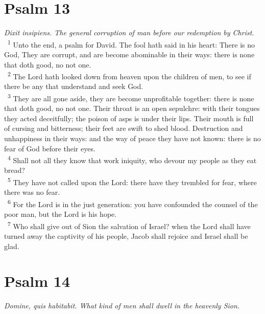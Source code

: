 \documentclass[a5paper,12pt]{article}
\begin{document}
\begin{multicols*}{2}
\section{Psalm 13}
\label{sec:org288996b}
\emph{Dixit insipiens. The general corruption of man before our redemption by Christ.}\\

~\textsuperscript{1} Unto the end, a psalm for David. The fool hath said in his heart: There is no God, They are corrupt, and are become abominable in their ways: there is none that doth good, no not one.\\
~\textsuperscript{2} The Lord hath looked down from heaven upon the children of men, to see if there be any that understand and seek God.\\
~\textsuperscript{3} They are all gone aside, they are become unprofitable together: there is none that doth good, no not one. Their throat is an open sepulchre: with their tongues they acted deceitfully; the poison of asps is under their lips. Their mouth is full of cursing and bitterness; their feet are swift to shed blood. Destruction and unhappiness in their ways: and the way of peace they have not known: there is no fear of God before their eyes.\\
~\textsuperscript{4} Shall not all they know that work iniquity, who devour my people as they eat bread?\\
~\textsuperscript{5} They have not called upon the Lord: there have they trembled for fear, where there was no fear.\\
~\textsuperscript{6} For the Lord is in the just generation: you have confounded the counsel of the poor man, but the Lord is his hope.\\
~\textsuperscript{7} Who shall give out of Sion the salvation of Israel? when the Lord shall have turned away the captivity of his people, Jacob shall rejoice and Israel shall be glad.\\

\section{Psalm 14}
\label{sec:org451b922}
\emph{Domine, quis habitabit. What kind of men shall dwell in the heavenly Sion.}\\


\end{multicols*}
\end{document}
